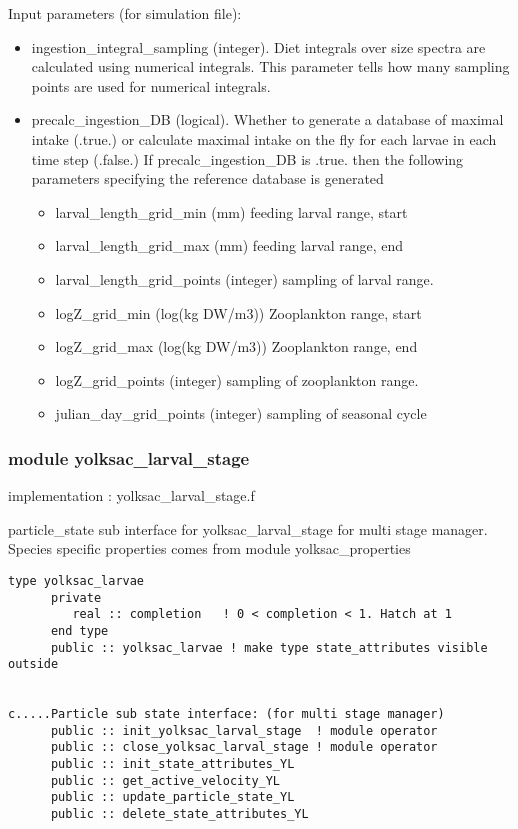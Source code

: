 Input parameters (for simulation file):\newline
\begin{itemize}
  \item ingestion\_integral\_sampling (integer). Diet integrals over
        size spectra are calculated using numerical integrals. This parameter
        tells how many sampling points are used for numerical integrals.  
  \item precalc\_ingestion\_DB (logical). Whether to generate a database of
        maximal intake (.true.) or calculate  maximal intake on the fly for each larvae in 
        each time step (.false.)
        If precalc\_ingestion\_DB is .true. then the following parameters
        specifying the reference database is generated
        \begin{itemize}
          \item larval\_length\_grid\_min (mm) feeding larval range, start
          \item larval\_length\_grid\_max (mm) feeding larval range, end
          \item larval\_length\_grid\_points (integer) sampling of larval range.
          \item logZ\_grid\_min (log(kg DW/m3)) Zooplankton range, start
          \item logZ\_grid\_max (log(kg DW/m3)) Zooplankton range, end
          \item logZ\_grid\_points (integer) sampling of zooplankton range.
          \item julian\_day\_grid\_points (integer) sampling of seasonal cycle
  \end{itemize}
\end{itemize}

\subsubsection{module yolksac\_larval\_stage}                     implementation : yolksac\_larval\_stage.f

particle\_state sub interface for yolksac\_larval\_stage for
multi stage manager. Species specific properties comes from 
module yolksac\_properties     

\begin{verbatim}
type yolksac_larvae
      private
         real :: completion   ! 0 < completion < 1. Hatch at 1
      end type
      public :: yolksac_larvae ! make type state_attributes visible outside


c.....Particle sub state interface: (for multi stage manager)
      public :: init_yolksac_larval_stage  ! module operator
      public :: close_yolksac_larval_stage ! module operator
      public :: init_state_attributes_YL
      public :: get_active_velocity_YL
      public :: update_particle_state_YL
      public :: delete_state_attributes_YL
\end{verbatim}


